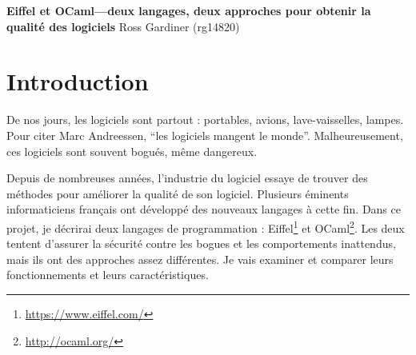 \documentclass[french]{report}
\begin{document}
\begin{titlepage}
	\centering
	\vfill
	{\bfseries\Large
		Eiffel et OCaml---deux langages, deux approches pour obtenir la qualité des logiciels
		\vskip2cm
	}
	\large{Ross Gardiner (rg14820)}
	\vfill
	\hspace*{.2in}
	\vfill
	\vfill
\end{titlepage}

\tableofcontents

\doublespacing

\chapter{Introduction}

De nos jours, les logiciels sont partout : portables, avions, lave-vaisselles, lampes. Pour citer Marc Andreessen, \enquote{les logiciels mangent le monde}. Malheureusement, ces logiciels sont souvent bogués, même dangereux.

Depuis de nombreuses années, l’industrie du logiciel essaye de trouver des méthodes pour améliorer la qualité de son logiciel. Plusieurs éminents informaticiens français ont développé des nouveaux langages à cette fin. Dans ce projet, je décrirai deux langages de programmation : Eiffel\footnote{\url{https://www.eiffel.com/}} et OCaml\footnote{\url{http://ocaml.org/}}. Les deux tentent d’assurer la sécurité contre les \glspl{bogue} et les comportements inattendus, mais ils ont des approches assez différentes. Je vais examiner et comparer leurs fonctionnements et leurs caractéristiques.
\end{document}
